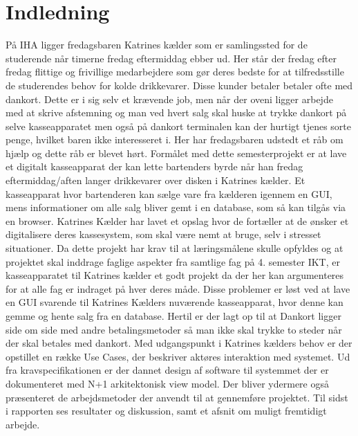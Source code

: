 \chapter{Indledning}
På \gls{IHA} ligger fredagsbaren Katrines kælder som er samlingssted for de studerende når timerne 
fredag eftermiddag ebber ud. Her står der fredag efter fredag flittige og frivillige medarbejdere som gør deres bedste for at 
tilfredsstille de studerendes behov for kolde drikkevarer. Disse kunder betaler betaler ofte med dankort. Dette er i sig selv et krævende job, men når der oveni ligger arbejde
med at skrive afstemning og man ved hvert salg skal huske at trykke dankort på selve kasseapparatet men også på dankort 
terminalen kan der hurtigt tjenes sorte penge, hvilket baren ikke interesseret i. 
Her har fredagsbaren udstedt et råb om hjælp og dette råb er blevet hørt. 
\newline
\newline
Formålet med dette semesterprojekt er at lave et digitalt kasseapparat der kan lette bartenders byrde når han fredag eftermiddag/aften langer drikkevarer over disken i Katrines kælder. Et kasseapparat hvor bartenderen kan sælge vare fra kælderen igennem en GUI, mens informationer om alle salg bliver gemt i en database, som så kan tilgås via en browser.
\newline
\newline
Katrines Kælder har lavet et opslag hvor de fortæller at de ønsker et digitalisere deres kassesystem, som skal være nemt at bruge, selv i stresset situationer. Da dette projekt har krav til at læringsmålene skulle opfyldes og at projektet skal inddrage faglige aspekter fra samtlige fag på 4. semester IKT, er kasseapparatet til Katrines kælder et godt projekt da der her kan argumenteres for at alle fag er indraget på hver deres måde.
\newline
\newline
Disse problemer er løst ved at lave en GUI svarende til Katrines Kælders nuværende kasseapparat, hvor denne kan gemme og hente salg fra en database. Hertil er der lagt op til at Dankort ligger side om side med andre betalingsmetoder så man ikke skal trykke to steder når der skal betales med dankort. 
\newline
\newline
Med udgangspunkt i Katrines kælders behov er der opstillet en række Use Cases, der beskriver aktøres interaktion med systemet. Ud fra kravspecifikationen er der dannet design af software til systemmet der er dokumenteret med N+1 arkitektonisk view model. Der bliver ydermere også præsenteret de arbejdsmetoder der anvendt til at gennemføre projektet. Til sidst i rapporten ses resultater og diskussion, samt et afsnit om muligt fremtidigt arbejde. 